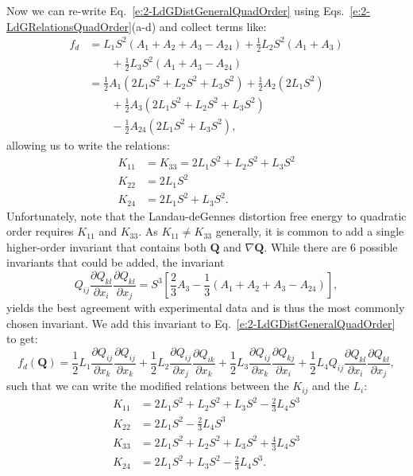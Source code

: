 Now we can re-write Eq.~\ref{e:2-LdGDistGeneralQuadOrder} using Eqs.~\ref{e:2-LdGRelationsQuadOrder}(a-d) and collect terms like:
\begin{align}
  f_d &= L_1 S^2 (A_1 + A_2 + A_3 -A_{24}) + \frac{1}{2}L_2 S^2 (A_1 + A_3) \nonumber \\
  & \quad \quad + \frac{1}{2}L_3 S^2 (A_1 + A_3 - A_{24}) \\
      &= \frac{1}{2}A_1(2 L_1 S^2 + L_2 S^2 +L_3 S^2) + \frac{1}{2}A_2(2 L_1 S^2) \nonumber \\
      & \quad \quad + \frac{1}{2}A_3(2 L_1 S^2 + L_2 S^2 +L_3 S^2) \nonumber \\
      & \quad \quad - \frac{1}{2}A_{24}(2 L_1 S^2 + L_3 S^2),
\end{align}
allowing us to write the relations:
\begin{align}
  K_{11} &= K_{33} = 2 L_1 S^2 + L_2 S^2 +L_3 S^2\tag{\theequation a}\\
  K_{22} &= 2 L_1 S^2\tag{\theequation b}\\
  K_{24} &= 2 L_1 S^2 + L_3 S^2.\tag{\theequation c}
\end{align}
Unfortunately, note that the Landau-deGennes distortion free energy to quadratic order requires $K_{11}$ and $K_{33}$.
As $K_{11} \neq K_{33}$ generally, it is common to add a single higher-order invariant that contains both $\mathbf{Q}$ and $\nabla \mathbf{Q}$.
While there are 6 possible invariants that could be added, the invariant
\begin{equation}
  Q_{ij}\frac{\partial Q_{kl}}{\partial x_i} \frac{\partial Q_{kl}}{\partial x_j} = S^3 \left [\frac{2}{3}A_3 - \frac{1}{3}(A_1+A_2+A_3-A_{24}) \right ],
\end{equation}
yields the best agreement with experimental data and is thus the most commonly chosen invariant.
We add this invariant to Eq.~\ref{e:2-LdGDistGeneralQuadOrder} to get:
\begin{equation}
  f_d(\mathbf{Q}) = \frac{1}{2} L_1 \frac{\partial Q_{ij}}{\partial x_k} \frac{\partial Q_{ij}}{\partial x_k}
    + \frac{1}{2} L_2 \frac{\partial Q_{ij}}{\partial x_j} \frac{\partial Q_{ik}}{\partial x_k}
    + \frac{1}{2} L_3 \frac{\partial Q_{ij}}{\partial x_k} \frac{\partial Q_{kj}}{\partial x_i}
    + \frac{1}{2} L_4 Q_{ij}\frac{\partial Q_{kl}}{\partial x_i} \frac{\partial Q_{kl}}{\partial x_j},\label{e:2-LdGDistGeneralHighOrder}
\end{equation}
such that we can write the modified relations between the $K_{ij}$ and the $L_i$:
\begin{align}\label{e:2-LdGFrankRelations}
  K_{11} &= 2 L_1 S^2 + L_2 S^2 +L_3 S^2 - \frac{2}{3}L_4 S^3\tag{\theequation a} \\
  K_{22} &= 2 L_1 S^2 - \frac{2}{3}L_4 S^3\tag{\theequation b} \\
  K_{33} &= 2 L_1 S^2 + L_2 S^2 +L_3 S^2 + \frac{4}{3}L_4 S^3\tag{\theequation c}\\
  K_{24} &= 2 L_1 S^2 + L_3 S^2 - \frac{2}{3}L_4 S^3\tag{\theequation d}.
\end{align}


